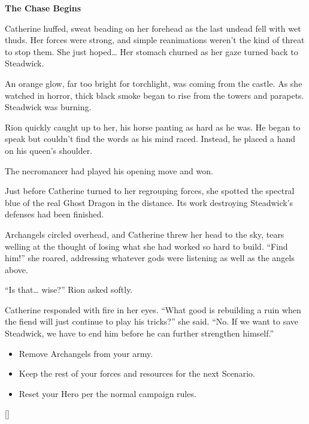 \begin{multicols*}{2}
\textbf{The Chase Begins}

Catherine huffed, sweat beading on her forehead as the last undead fell with wet thuds.
Her forces were strong, and simple reanimations weren't the kind of threat to stop them.
She just hoped… Her stomach churned as her gaze turned back to Steadwick.

An orange glow, far too bright for torchlight, was coming from the castle.
As she watched in horror, thick black smoke began to rise from the towers and parapets.
Steadwick was burning.

Rion quickly caught up to her, his horse panting as hard as he was.
He began to speak but couldn't find the words as his mind raced.
Instead, he placed a hand on his queen's shoulder. 

The necromancer had played his opening move and won.

Just before Catherine turned to her regrouping forces, she spotted the spectral blue of the real Ghost Dragon in the distance.
Its work destroying Steadwick's defenses had been finished.

Archangels circled overhead, and Catherine threw her head to the sky, tears welling at the thought of losing what she had worked so hard to build.
``Find him!'' she roared, addressing whatever gods were listening as well as the angels above.

``Is that… wise?'' Rion asked softly.

Catherine responded with fire in her eyes.
``What good is rebuilding a ruin when the fiend will just continue to play his tricks?'' she said.
``No.
If we want to save Steadwick, we have to end him before he can further strengthen himself.''

\begin{itemize}
  \item \textcolor{darkcandyapplered}{Remove Archangels from your army.}
  \item \textcolor{darkcandyapplered}{Keep the rest of your forces and resources for the next Scenario.}
  \item \textcolor{darkcandyapplered}{Reset your Hero per the normal campaign rules.}
\end{itemize}

\columnbreak

\begin{center}
\raisebox{0pt}[\dimexpr{}\baselineskip\relax]{}
\end{center}

\end{multicols*}
